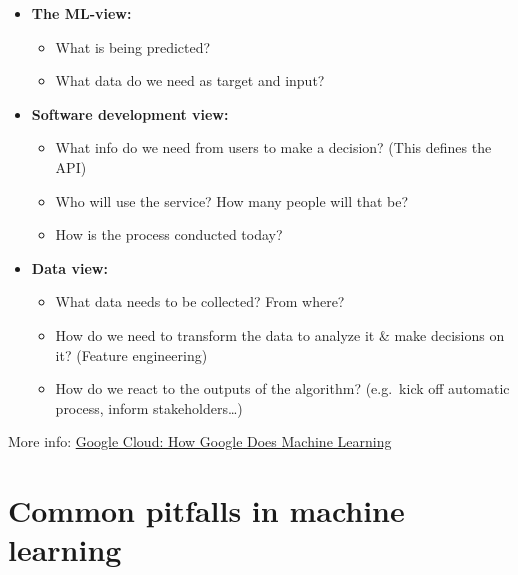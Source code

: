 \documentclass[
]{book}
\begin{document}
\begin{itemize}
\item
  \textbf{The ML-view:}

  \begin{itemize}
  \item
    What is being predicted?
  \item
    What data do we need as target and input?
  \end{itemize}
\item
  \textbf{Software development view:}

  \begin{itemize}
  \item
    What info do we need from users to make a decision? (This
    defines the API)
  \item
    Who will use the service? How many people will that be?
  \item
    How is the process conducted today?
  \end{itemize}
\item
  \textbf{Data view:}

  \begin{itemize}
  \item
    What data needs to be collected? From where?
  \item
    How do we need to transform the data to analyze it \& make
    decisions on it? (Feature engineering)
  \item
    How do we react to the outputs of the algorithm? (e.g.~kick off
    automatic process, inform stakeholders\ldots)
  \end{itemize}
\end{itemize}

More info: \href{https://www.cloudskillsboost.google/course_templates/10}{Google Cloud: How Google Does Machine
Learning}

\hypertarget{common-pitfalls-in-machine-learning}{%
\section{Common pitfalls in machine learning}\label{common-pitfalls-in-machine-learning}}
\end{document}
